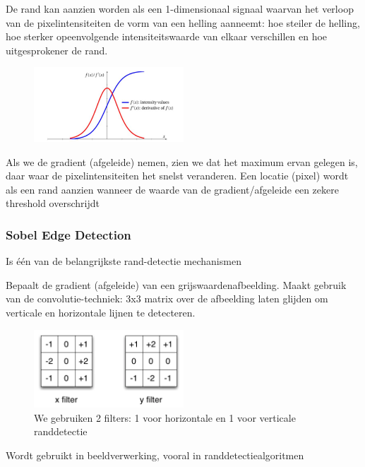 \documentclass{article}
\begin{document}
De rand kan aanzien worden als een 1-dimensionaal signaal waarvan het
verloop van de pixelintensiteiten de vorm van een helling aanneemt:
hoe steiler de helling, hoe sterker opeenvolgende intensiteitswaarde
van elkaar verschillen en hoe uitgesprokener de rand.

\begin{figure}[H]
    \centering
    \includegraphics[width=0.5\textwidth]{convolution-edgedetection4.png}
    \caption{}
\end{figure}

Als we de gradient (afgeleide) nemen, zien we dat het maximum ervan
gelegen is, daar waar de pixelintensiteiten het snelst veranderen. Een
locatie (pixel) wordt als een rand aanzien wanneer de waarde van de
gradient/afgeleide een zekere threshold overschrijdt

\subsubsection{Sobel Edge Detection}

Is één van de belangrijkste rand-detectie mechanismen

Bepaalt de gradient (afgeleide) van een grijswaardenafbeelding.
Maakt gebruik van de convolutie-techniek: 3x3 matrix over de afbeelding
laten glijden om verticale en horizontale lijnen te detecteren.

\begin{figure}[H]
    \centering
    \includegraphics[width=0.5\textwidth]{sobel-edgedetection.png}
    \caption{We gebruiken 2 filters: 1 voor horizontale en 1 voor verticale randdetectie}
\end{figure}

Wordt gebruikt in beeldverwerking, vooral in randdetectiealgoritmen
\end{document}
